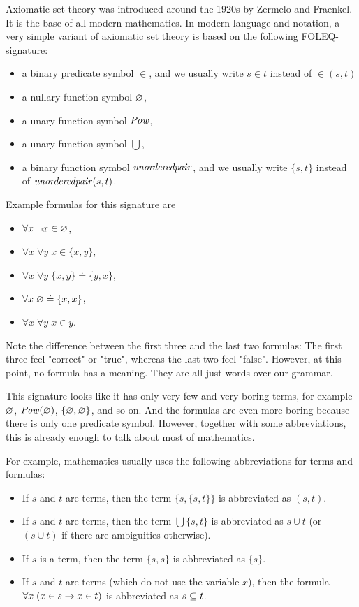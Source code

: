 \begin{example}
Axiomatic set theory was introduced around the 1920s by Zermelo and Fraenkel. It is the base of all modern mathematics. In modern language and notation, a very simple variant of axiomatic set theory is based on the following FOLEQ-signature:
\begin{itemize}
\item a binary predicate symbol $\in$, and we usually write $s\in t$ instead of $\in(s,t)$
\item a nullary function symbol $\varnothing$,
\item a unary function symbol $\mathit{Pow}$,
\item a unary function symbol $\bigcup$,
\item a binary function symbol $\mathit{unorderedpair}$, and we usually write $\{s,t\}$ instead of $\mathit{unorderedpair}(s,t)$.
\end{itemize}

Example formulas for this signature are
\begin{itemize}
\item $\forall x \; \neg x\in\varnothing$,
\item $\forall x \; \forall y \; x \in \{x,y\}$,
\item $\forall x \; \forall y \; \{x,y\} \doteq \{y,x\}$,
\item $\forall x \; \varnothing \doteq \{x,x\}$,
\item $\forall x \; \forall y \; x \in y$.
\end{itemize}
Note the difference between the first three and the last two formulas: The first three feel "correct" or "true", whereas the last two feel "false". However, at this point, no formula has a meaning. They are all just words over our grammar.

This signature looks like it has only very few and very boring terms, for example $\varnothing$, $\mathit{Pow}(\varnothing)$, $\{\varnothing,\varnothing\}$, and so on. And the formulas are even more boring because there is only one predicate symbol. However, together with some abbreviations, this is already enough to talk about most of mathematics.

For example, mathematics usually uses the following abbreviations for terms and formulas:
\begin{itemize}
\item If $s$ and $t$ are terms, then the term $\{s,\{s,t\}\}$ is abbreviated as $(s,t)$.
\item If $s$ and $t$ are terms, then the term $\bigcup\{s,t\}$ is abbreviated as $s\cup t$ (or $(s\cup t)$ if there are ambiguities otherwise).
\item If $s$ is a term, then the term $\{s,s\}$ is abbreviated as $\{s\}$.
\item If $s$ and $t$ are terms (which do not use the variable $x$), then the formula $\forall x\; (x\in s \rightarrow x\in t)$ is abbreviated as $s\subseteq t$.
\end{itemize}


\end{example}
